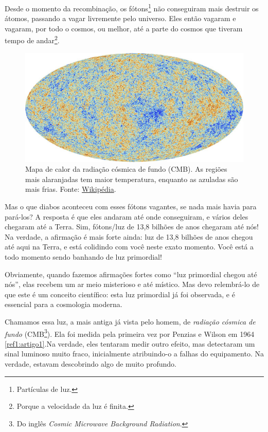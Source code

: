\begin{multicols}{2}

Desde o momento da recombinação, os fótons\footnote{Partículas de luz.}  não conseguiram mais destruir os átomos, passando a vagar livremente pelo universo. Eles então vagaram e vagaram, por todo o cosmos, ou melhor, até a parte do cosmos que tiveram tempo de andar\footnote{Porque a velocidade da luz é finita.}. 

\begin{figure}[H]
	\centering
	\includegraphics[width=0.9\linewidth]{Figuras/Artigo1/CMB.jpg}
	\caption{\small Mapa de calor da radiação cósmica de fundo (CMB). As regiões mais alaranjadas tem maior temperatura, enquanto as azuladas são mais frias. Fonte: \href{https://en.wikipedia.org/wiki/Cosmic_microwave_background}{Wikipédia}.}
	\label{fig:CMB}
\end{figure}

Mas o que diabos aconteceu com esses fótons vagantes, se nada mais havia para pará-los? A resposta é que eles andaram até onde conseguiram, e vários deles chegaram até a Terra. Sim, fótons/luz de 13,8 bilhões de anos chegaram até nós! Na verdade, a afirmação é mais forte ainda: luz de 13,8 bilhões de anos chegou até aqui na Terra, e está colidindo com você neste exato momento. Você está a todo momento sendo banhando de luz primordial!

Obviamente, quando fazemos afirmações fortes como ``luz primordial chegou até nós'', elas recebem um ar meio misterioso e até místico. Mas devo relembrá-lo de que este é um conceito científico: esta luz primordial já foi observada, e é essencial para a cosmologia moderna.

Chamamos essa luz, a mais antiga já vista pelo homem, de \textit{radiação cósmica de fundo} (CMB\footnote{Do inglês \textit{Cosmic Microwave Background Radiation}.}). Ela foi medida pela primeira vez por Penzias e Wilson em 1964 \ref{ref1:artigo1}.Na verdade, eles tentaram medir outro efeito, mas detectaram um sinal luminoso muito fraco, inicialmente atribuindo-o a falhas do equipamento. Na verdade, estavam descobrindo algo de muito profundo.


\end{multicols}

